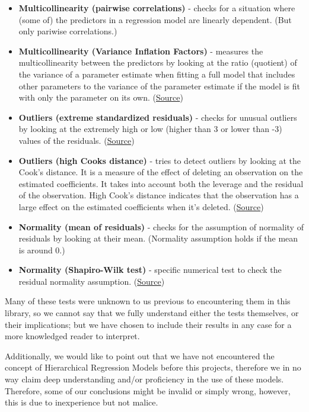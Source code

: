 \documentclass[11pt, oneside]{article}   	%
\begin{document}
\begin{itemize}
    \item \textbf{Multicollinearity (pairwise correlations)} - checks for a situation where (some of) the predictors in a regression model are linearly dependent. (But only pariwise correlations.)
    \item \textbf{Multicollinearity (Variance Inflation Factors)} - measures the multicollinearity between the predictors by looking at the ratio (quotient) of the variance of a parameter estimate when fitting a full model that includes other parameters to the variance of the parameter estimate if the model is fit with only the parameter on its own. (\href{https://en.wikipedia.org/wiki/Variance_inflation_factor}{Source})
    \item \textbf{Outliers (extreme standardized residuals)} - checks for unusual outliers by looking at the extremely high or low (higher than 3 or lower than -3) values of the residuals. (\href{https://www.statisticshowto.com/what-is-a-standardized-residuals/#:~:text=If%20your%20residuals%20are%20%2B%2F%2D,standard%20deviations%20from%20the%20mean.}{Source})
    \item \textbf{Outliers (high Cooks distance)} - tries to detect outliers by looking at the Cook’s distance. It is a measure of the effect of deleting an observation on the estimated coefficients. It takes into account both the leverage and the residual of the observation. High Cook’s distance indicates that the observation has a large effect on the estimated coefficients when it’s deleted. (\href{https://prepnuggets.com/glossary/cooks-distance/#:~:text=Cook's%20distance%20is%20a%20measure,estimated%20coefficients%20when%20it's%20deleted.}{Source})
    \item \textbf{Normality (mean of residuals)} - checks for the assumption of normality of residuals by looking at their mean. (Normality assumption holds if the mean is around 0.)
    \item \textbf{Normality (Shapiro-Wilk test)} - specific numerical test to check the residual normality assumption. (\href{https://en.wikipedia.org/wiki/Shapiro%E2%80%93Wilk_test}{Source})
\end{itemize}

Many of these tests were unknown to us previous to encountering them in this library, so we cannot say that we fully understand either the tests themselves, or their implications; but we have chosen to include their results in any case for a more knowledged reader to interpret.

Additionally, we would like to point out that we have not encountered the concept of Hierarchical Regression Models before this projects, therefore we in no way claim deep understanding and/or proficiency in the use of these models. Therefore, some of our conclusions might be invalid or simply wrong, however, this is due to inexperience but not malice.\\
\end{document}
